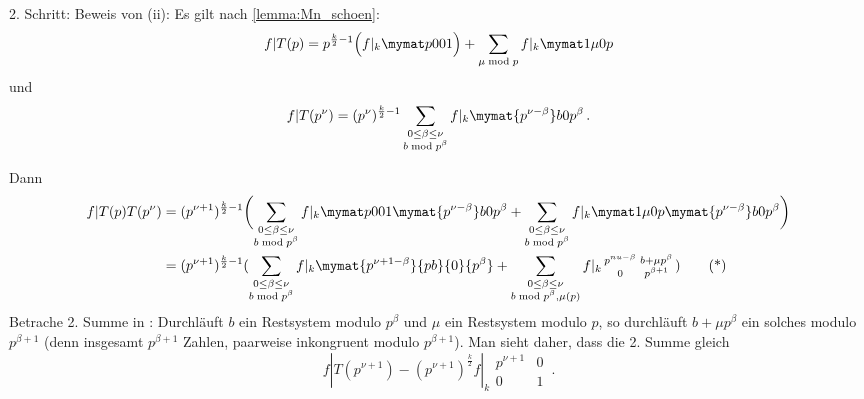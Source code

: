 \begin{bewe}
	
	2. Schritt: Beweis von (ii):
	Es gilt nach \autoref{lemma:Mn_schoen}: \[f|T(p) = p^{\frac{k}{2}-1} \Bigl(f|_k \mymat p001\Bigr) + \sum_{\mu \bmod p} f|_k \mymat 1\mu0p\]
	und
	\[
		f|T(p^\nu) = (p^\nu)^{\frac{k}{2}-1} \sum_{\substack{0 \leq \beta \leq \nu \\ b \bmod p^\beta}} f|_k \mymat{p^{\nu-\beta}}b0{p^\beta}
		\,.
	\]
	
	Dann
	\begin{align*}
		f|T(p)T(p^\nu)
		&= (p^{\nu+1})^{\frac{k}{2}-1} \biggl( \sum_{\substack{0 \leq \beta \leq \nu \\ b \bmod p^\beta}} f|_k \mymat p001 \mymat {p^{\nu-\beta}}b0{p^\beta} + \sum_{\substack{0 \leq \beta \leq \nu \\ b \bmod p^\beta}} f|_k \mymat 1\mu0p \mymat {p^{\nu-\beta}}b0{p^\beta} \biggr) \\
		&= (p^{\nu+1})^{\frac{k}{2}-1} ( \sum_{\substack{0 \leq \beta \leq \nu\\b \bmod p^\beta}} f|_k \mymat {p^{\nu +1-\beta}}{pb}{0}{p^\beta} + \sum_{\substack{0 \leq \beta \leq \nu \\ b \bmod p^\beta, \mu(p)}} f|_k \begin{smallmatrix}
		p^{nu-\beta} & b+\mu p^\beta \\ 0 & p^{\beta+1}
		\end{smallmatrix}) \tag{*}
	\end{align*}
	Betrache 2. Summe in \myref{(*)}:
	Durchläuft $b$ ein Restsystem modulo $p^\beta$ und $\mu$ ein Restsystem modulo $p$, so durchläuft $b+\mu p^\beta$ ein solches modulo $p^{\beta+1}$ (denn insgesamt $p^{\beta+1}$ Zahlen, paarweise inkongruent modulo $p^{\beta+1}$).
	Man sieht daher, dass die 2. Summe gleich
	\[
		f|T(p^{\nu+1}) - (p^{\nu+1})^{\frac{k}{2}} f|_k \begin{smallmatrix} p^{\nu+1} & 0 \\ 0 & 1 \end{smallmatrix} \,.
	\]
	

\end{bewe}

